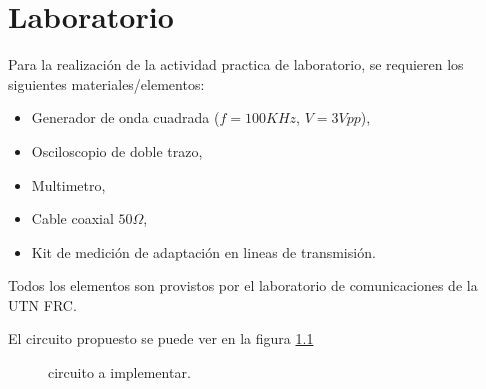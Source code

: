 \chapter{Laboratorio}
  Para la realización de la actividad practica de laboratorio, se requieren los siguientes materiales/elementos:
  \begin{itemize}
    \item Generador de onda cuadrada ($f = 100KHz$, $V = 3Vpp$),
    \item Osciloscopio de doble trazo,
    \item Multimetro,
    \item Cable coaxial $50 \Omega$,
    \item Kit de medición de adaptación en lineas de transmisión.
  \end{itemize}

  Todos los elementos son provistos por el laboratorio de comunicaciones de la UTN FRC.

  El circuito propuesto se puede ver en la figura \ref{fig:crkt}

  \begin{figure}[!ht]
    \centering
    
    \caption{circuito a implementar.}
    \label{fig:crkt}
  \end{figure}
  
